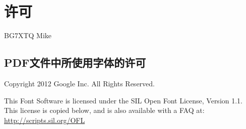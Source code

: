 \chapter*{许可}

\noindent {} BG7XTQ Mike

\section*{PDF文件中所使用字体的许可}

\noindent Copyright 2012 Google Inc. All Rights Reserved.

\noindent This Font Software is licensed under the SIL Open Font License, Version 1.1.
This license is copied below, and is also available with a FAQ at:
\url{http://scripts.sil.org/OFL}
